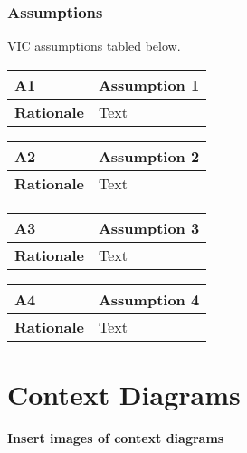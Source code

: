 \documentclass [11pt]{article}
\begin{document}
\subsubsection{Assumptions}
VIC assumptions tabled below. 
\begin{longtable}{| p{ } | p{ } | }\hline 
\rowcolor{tableCell}\textbf{A1} & Assumption 1 \\ \hline
\textbf{Rationale} & Text \\ \hline 
\end{longtable}

\begin{longtable}{| p{ } | p{ } | }\hline 
\rowcolor{tableCell}\textbf{A2} & Assumption 2 \\ \hline
\textbf{Rationale} &  Text\\ \hline
\end{longtable}

\begin{longtable}{| p{ } | p{ } | }\hline 
\rowcolor{tableCell}\textbf{A3} & Assumption 3 \\ \hline
\textbf{Rationale} &  Text \\ \hline
\end{longtable}

\begin{longtable}{| p{ } | p{ } | }\hline 
\rowcolor{tableCell}\textbf{A4} &Assumption 4 \\ \hline
\textbf{Rationale} &  Text\\ \hline
\end{longtable}



\section{Context Diagrams}
\textbf{Insert images of context diagrams}
\end{document}
